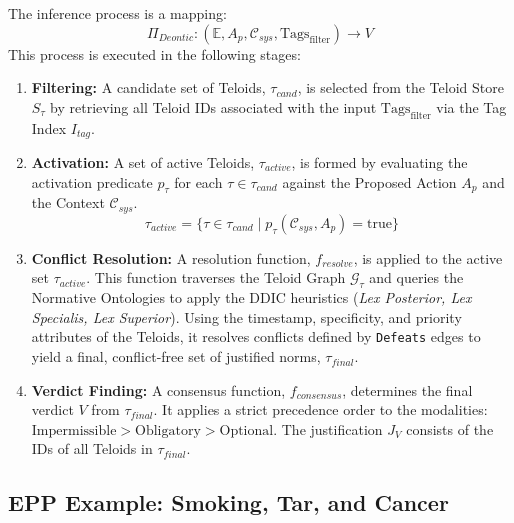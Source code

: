 \begin{definition}
\label{def:ethos_deontic_inference} 
The inference process is a mapping:
\[ \Pi_{Deontic}: (\mathbb{E}, A_p, \mathcal{C}_{sys}, \text{Tags}_{\text{filter}}) \to V \]
This process is executed in the following stages:
\begin{enumerate}
    \item \textbf{Filtering:} A candidate set of Teloids, \(\tau_{cand}\), is selected from the Teloid Store \(S_\tau\) by retrieving all Teloid IDs associated with the input \(\text{Tags}_{\text{filter}}\) via the Tag Index \(I_{tag}\).
    
    \item \textbf{Activation:} A set of active Teloids, \(\tau_{active}\), is formed by evaluating the activation predicate \(p_\tau\) for each \(\tau \in \tau_{cand}\) against the Proposed Action \(A_p\) and the Context \(\mathcal{C}_{sys}\).
    \[ \tau_{active} = \{ \tau \in \tau_{cand} \mid p_\tau(\mathcal{C}_{sys}, A_p) = \text{true} \} \]
    
	\item \textbf{Conflict Resolution:} A resolution function, \(f_{resolve}\), is applied to the active set \(\tau_{active}\). This function traverses the Teloid Graph \(\mathcal{G}_\tau\) and queries the Normative Ontologies to apply the DDIC heuristics (\textit{Lex Posterior, Lex Specialis, Lex Superior}). Using the timestamp, specificity, and priority attributes of the Teloids, it resolves conflicts defined by \texttt{Defeats} edges to yield a final, conflict-free set of justified norms, \(\tau_{final}\).
    
    \item \textbf{Verdict Finding:} A consensus function, \(f_{consensus}\), determines the final verdict \(V\) from \(\tau_{final}\). It applies a strict precedence order to the modalities: \(\text{Impermissible} > \text{Obligatory} > \text{Optional}\). The justification \(J_V\) consists of the IDs of all Teloids in \(\tau_{final}\).
\end{enumerate}
\end{definition} 


\subsection{EPP Example: Smoking, Tar, and Cancer}
\label{sec:formalization_example_smoking_tar_cancer}

